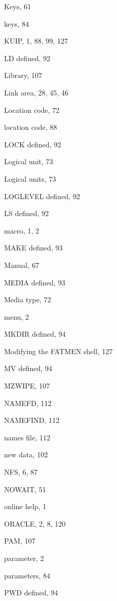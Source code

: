 \begin{theindex}
  \item Keys, 61
  \item keys, 84
  \item KUIP, 1, 88, 99, 127

  \indexspace

  \item LD
    \subitem defined, 92
  \item Library, 107
  \item Link area, 28, 45, 46
  \item Location code, 72
  \item location code, 88
  \item LOCK
    \subitem defined, 92
  \item Logical unit, 73
  \item Logical units, 73
  \item LOGLEVEL
    \subitem defined, 92
  \item LS
    \subitem defined, 92

  \indexspace

  \item macro, 1, 2
  \item MAKE
    \subitem defined, 93
  \item Manual, 67
  \item MEDIA
    \subitem defined, 93
  \item Media type, 72
  \item menu, 2
  \item MKDIR
    \subitem defined, 94
  \item Modifying the FATMEN shell, 127
  \item MV
    \subitem defined, 94
  \item MZWIPE, 107

  \indexspace

  \item NAMEFD, 112
  \item NAMEFIND, 112
  \item names file, 112
  \item new data, 102
  \item NFS, 6, 87
  \item NOWAIT, 51

  \indexspace

  \item online help, 1
  \item ORACLE, 2, 8, 120

  \indexspace

  \item PAM, 107
  \item parameter, 2
  \item parameters, 84
  \item PWD
    \subitem defined, 94


\end{theindex}
